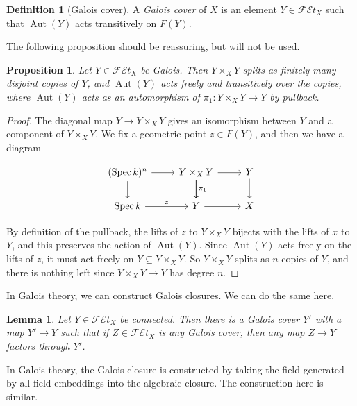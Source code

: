 \documentclass{shortart}
\newtheorem*{prop}{Proposition}
\newtheorem*{lemma}{Lemma}
\theoremstyle{definition}
\newtheorem*{defi}{Definition}
\newcommand\FEt[1]{\mathscr{FE}t_{#1}}
\DeclareMathOperator\Spec{Spec}
\DeclareMathOperator\Aut{Aut}
\begin{document}
\begin{defi}[Galois cover]
  A \emph{Galois cover} of $X$ is an element $Y \in \FEt{X}$ such that $\Aut(Y)$ acts transitively on $F(Y)$.
\end{defi}
The following proposition should be reassuring, but will not be used.
\begin{prop}
  Let $Y \in \FEt{X}$ be Galois. Then $Y \times_X Y$ splits as finitely many disjoint copies of $Y$, and $\Aut(Y)$ acts freely and transitively over the copies, where $\Aut(Y)$ acts as an automorphism of $\pi_1: Y \times_X Y \to Y$ by pullback.
\end{prop}

\begin{proof}
  The diagonal map $Y \to Y \times_X Y$ gives an isomorphism between $Y$ and a component of $Y \times_X Y$. We fix a geometric point $z \in F(Y)$, and then we have a diagram
  \begin{useimager}
    \[
      \begin{tikzcd}
        (\Spec k)^n \ar[d] \ar[r] & Y \times_X Y \ar[d, "\pi_1"] \ar[r] \ar[d] & Y \ar[d]\\
        \Spec k \ar[r, "z"] & Y \ar[r] & X
      \end{tikzcd}
    \]
  \end{useimager}
  By definition of the pullback, the lifts of $z$ to $Y \times_X Y$ bijects with the lifts of $x$ to $Y$, and this preserves the action of $\Aut(Y)$. Since $\Aut(Y)$ acts freely on the lifts of $z$, it must act freely on $Y \subseteq Y \times_X Y$. So $Y \times_X Y$ splits as $n$ copies of $Y$, and there is nothing left since $Y \times_X Y \to Y$ has degree $n$.
\end{proof}

In Galois theory, we can construct Galois closures. We can do the same here.
\begin{lemma}
  Let $Y \in \FEt{X}$ be connected. Then there is a Galois cover $Y'$ with a map $Y' \to Y$ such that if $Z \in \FEt{X}$ is any Galois cover, then any map $Z \to Y$ factors through $Y'$.
\end{lemma}
In Galois theory, the Galois closure is constructed by taking the field generated by all field embeddings into the algebraic closure. The construction here is similar.
\end{document}
